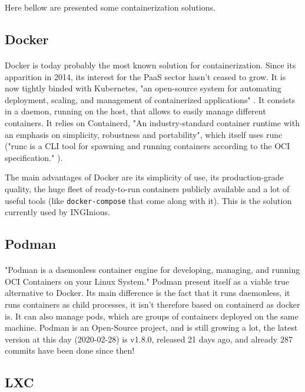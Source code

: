Here bellow are presented some containerization solutions.

\subsection{Docker}
\paragraph{}Docker\cite{merkel2014docker} is today probably the most known solution for containerization.  Since its apparition in 2014, its interest for the PaaS sector hasn't ceased to grow.  It is now tightly binded with Kubernetes, "an open-source system for automating deployment, scaling, and management of containerized applications" \cite{kubernetes}.  It consists in a daemon, running on the host, that allows to easily manage different containers.  It relies on Containerd, "An industry-standard container runtime with an emphasis on simplicity, robustness and portability"\cite{containerd}, which itself uses runc ("runc is a CLI tool for spawning and running containers according to the OCI specification." \cite{runc}).

The main advantages of Docker are its simplicity of use, its production-grade quality, the huge fleet of ready-to-run containers publicly available and a lot of useful tools (like \texttt{docker-compose} that come along with it).  This is the solution currently used by INGInious.

\subsection{Podman}
\paragraph{}"Podman is a daemonless container engine for developing, managing, and running OCI Containers on your Linux System."\cite{podman}  Podman present itself as a viable true alternative to Docker.  Its main difference is the fact that it runs daemonless, it runs containers as child processes, it isn't therefore based on containerd as docker is.  It can also manage pods, which are groups of containers deployed on the same machine.  Podman is an Open-Source project, and is still growing a lot, the latest version at this day (2020-02-28) is v1.8.0, released 21 days ago, and already 287 commits have been done since then!

\subsection{LXC}
